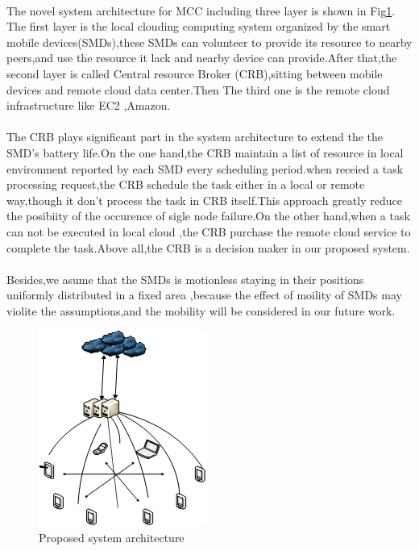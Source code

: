 \documentclass[review]{elsarticle}
\begin{document}
    \paragraph{}
    The novel system architecture for MCC including three layer is shown in Fig\ref{fig:architecture}. The first layer is the local clouding computing system organized by the smart mobile devices(SMDs),these SMDs can volunteer to provide its resource to nearby peers,and use the resource it lack and nearby device can provide.After that,the second layer is called Central resource Broker (CRB),sitting between mobile devices and remote cloud data center.Then The third one is the remote cloud infrastructure like EC2 ,Amazon.
    \paragraph{}
    The CRB plays significant part in the system architecture to extend the the SMD's battery life.On the one hand,the CRB maintain a list of resource in local environment reported by each SMD every scheduling period.when receied a task processing request,the CRB schedule the task either in a local or remote way,though it don't process the task in CRB itself.This approach greatly reduce the posibiity of the occurence of sigle node failure.On the other hand,when a task can not be executed in local cloud ,the CRB purchase the remote cloud service to complete the task.Above all,the CRB is a decision maker in our proposed system.
    \paragraph{}
    Besides,we asume that the SMDs is motionless staying in their positions uniformly distributed in a fixed area \cite{vellore2009performance},because the effect of moility of SMDs may violite the assumptions,and the mobility will be considered in our future work.
\begin{figure}[ht]
\centering
\includegraphics[scale=0.7]{architecture.png}
\caption{Proposed system architecture}
\label{fig:architecture}
\end{figure}
\end{document}
